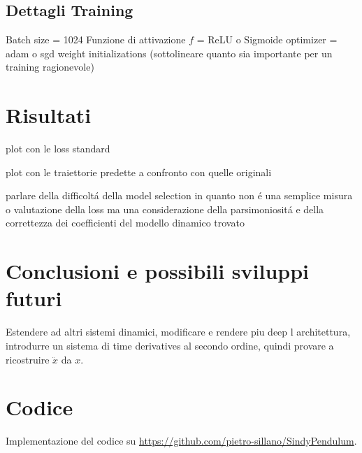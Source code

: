 \documentclass[11pt]{article}
\begin{document}
\subsection{Dettagli Training}
Batch size = 1024
Funzione di attivazione $f$ = ReLU o Sigmoide
optimizer = adam o sgd 
weight initializations (sottolineare quanto sia importante per un training ragionevole)

\section{Risultati}
plot con le loss standard

plot con le traiettorie predette a confronto con quelle originali

parlare della difficoltá della model selection in quanto non é una semplice misura  o valutazione della loss ma una considerazione della parsimoniositá e della correttezza dei coefficienti del modello dinamico trovato
\section{Conclusioni e possibili sviluppi futuri}
Estendere ad altri sistemi dinamici,
modificare e rendere piu deep l architettura,
introdurre un sistema di time derivatives al secondo ordine, quindi provare a ricostruire $\ddot{x}$ da  $x$.





\section{Codice}
Implementazione del codice su 
\url{https://github.com/pietro-sillano/SindyPendulum}.
\end{document}
